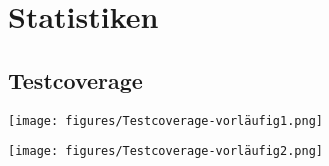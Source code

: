 \section{Statistiken}

\subsection{Testcoverage}

\texttt{[image: figures/Testcoverage-vorläufig1.png]}\par\vspace{1cm}
\texttt{[image: figures/Testcoverage-vorläufig2.png]}\par\vspace{1cm}